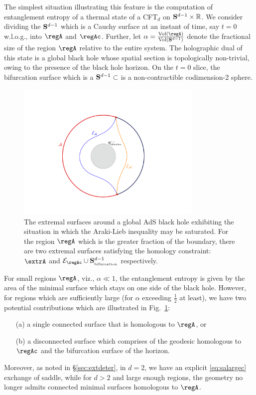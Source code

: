 \documentclass[12pt,openany]{book}
\begin{document}
The simplest situation illustrating this feature  is the computation of entanglement entropy of a thermal state of a CFT$_d$ on ${\bf S}^{d-1} \times {\mathbb R}$.  We consider dividing the ${\bf S}^{d-1}$ which is a Cauchy surface at an instant of time, say $t=0$ w.l.o.g., into $\regA$ and $\regAc$.  Further, let $\alpha = \frac{\text{Vol}(\regA)}{\text{Vol}({\bf S}^{d-1})}$ denote the fractional size of the region $\regA$ relative to the entire system. The holographic dual of this state is a global  black hole whose spatial section is topologically non-trivial, owing to the presence of the black hole horizon. On the $t=0$ slice, the bifurcation surface which is a ${\bf S}^{d-1} \subset$  is a non-contractible codimension-2 sphere.

\begin{figure}[htbp]
\begin{center}
\includegraphics[width=3.5in]{figures/al-picture}
\end{center}
\caption{The extremal surfaces around a global AdS black hole exhibiting the situation in which the Araki-Lieb inequality may be saturated. For the region $\regA$ which is the greater fraction of the boundary, there are two extremal surfaces satisfying the homology constraint: $\extrA$ and ${\cal E}_{\regAc} \cup {\bf S}^{d-1}_{_\text{bifurcation}}$ respectively. }
 \label{f:aldepict}
\end{figure}
%

For small regions $\regA$, viz., $\alpha \ll 1$, the entanglement entropy is given by the area of the minimal surface which stays on one side of the black hole.  However, for regions which are sufficiently large (for $\alpha$ exceeding $\frac{1}{2}$ at least), we have two potential contributions which are illustrated in Fig.~\ref{f:aldepict}:
%
\begin{enumerate}
\item[(a)] a single connected surface that is homologous to $\regA$, or
\item[(b)] a disconnected surface which comprises of the geodesic homologous to $\regAc$ and the bifurcation surface of the horizon.
\end{enumerate}
%
Moreover, as noted in \S\ref{sec:extdeter}, in $d=2$, we have an explicit \eqref{eq:salargec} exchange of saddle, while for $d>2$ and large enough regions,  the \SAdS{} geometry no longer admits connected minimal surfaces homologous to $\regA$.
\end{document}
